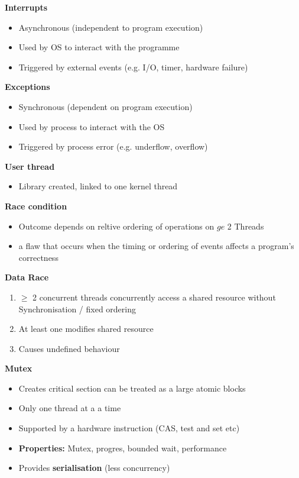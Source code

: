 \documentclass[10pt, landscape]{article}
\begin{document}
\begin{multicols}{4}
\textbf{Interrupts} \\
\begin{itemize}
    \item Asynchronous (independent to program execution) 
    \item Used by OS to interact with the programme
    \item Triggered by external events (e.g. I/O, timer, hardware failure)
\end{itemize}

\textbf{Exceptions} \\ 
\begin{itemize}
    \item Synchronous (dependent on program execution)
    \item Used by process to interact with the OS
    \item Triggered by process error (e.g. underflow, overflow)
\end{itemize}

\textbf{User thread} \\ 
\begin{itemize}
    \item Library created, linked to one kernel thread
\end{itemize}

\textbf{Race condition} \\
\begin{itemize}
    \item Outcome depends on reltive ordering of operations on $ge$ 2 Threads
    \item a flaw that occurs when the timing or ordering of events affects a program's correctness
\end{itemize}

\textbf{Data Race} \\ 
\begin{enumerate}
    \item $\ge$ 2 concurrent threads concurrently access a shared resource without Synchronisation / fixed ordering
    \item At least one modifies shared resource
    \item Causes undefined behaviour
\end{enumerate}

\textbf{Mutex} \\ 
\begin{itemize}
    \item Creates critical section can be treated as a large atomic blocks
    \item Only one thread at a a time
    \item Supported by a hardware instruction (CAS, test and set etc)
    \item \textbf{Properties:} Mutex, progres, bounded wait, performance 
    \item Provides \textbf{serialisation} (less concurrency)
\end{itemize}


\end{multicols}
\end{document}

